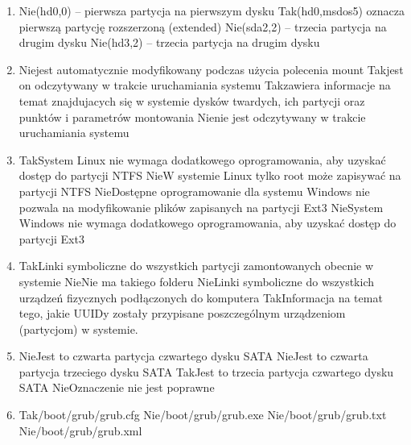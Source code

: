 \begin{enumerate}
	\item {}%
	{Nie}{(hd0,0) – pierwsza partycja na pierwszym dysku}%
	{Tak}{(hd0,msdos5) oznacza pierwszą partycję rozszerzoną (extended)}%
	{Nie}{(sda2,2) – trzecia partycja na drugim dysku}%
	{Nie}{(hd3,2) – trzecia partycja na drugim dysku}

	\item {}%
	{Nie}{jest automatycznie modyfikowany podczas użycia polecenia mount}%
	{Tak}{jest on odczytywany w trakcie uruchamiania systemu}%
	{Tak}{zawiera informacje na temat znajdujacych się w systemie dysków twardych, ich partycji oraz punktów i parametrów montowania}%
	{Nie}{nie jest odczytywany w trakcie uruchamiania systemu}

	\item {}%
	{Tak}{System Linux nie wymaga dodatkowego oprogramowania, aby uzyskać dostęp do partycji NTFS}%
	{Nie}{W systemie Linux tylko root może zapisywać na partycji NTFS}%
	{Nie}{Dostępne oprogramowanie dla systemu Windows nie pozwala na modyfikowanie plików zapisanych na partycji Ext3}%
	{Nie}{System Windows nie wymaga dodatkowego oprogramowania, aby uzyskać dostęp do partycji Ext3}

	\item {}%
	{Tak}{Linki symboliczne do wszystkich partycji zamontowanych obecnie w systemie}%
	{Nie}{Nie ma takiego folderu}%
	{Nie}{Linki symboliczne do wszystkich urządzeń fizycznych podłączonych do komputera}%
	{Tak}{Informacja na temat tego, jakie UUIDy zostały przypisane poszczególnym urządzeniom (partycjom) w systemie.}

	\item {}%
	{Nie}{Jest to czwarta partycja czwartego dysku SATA}%
	{Nie}{Jest to czwarta partycja trzeciego dysku SATA}%
	{Tak}{Jest to trzecia partycja czwartego dysku SATA}%
	{Nie}{Oznaczenie nie jest poprawne}

	\item {}%
	{Tak}{/boot/grub/grub.cfg}%
	{Nie}{/boot/grub/grub.exe}%
	{Nie}{/boot/grub/grub.txt}%
	{Nie}{/boot/grub/grub.xml}


	
	
	
		
\end{enumerate}